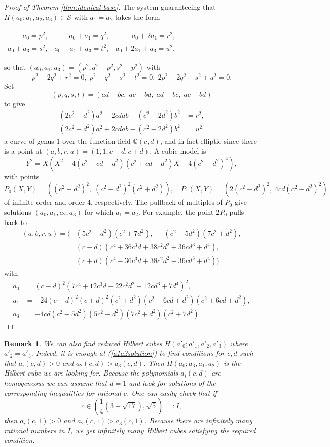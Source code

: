 \documentclass[10pt]{amsart}
\theoremstyle{plain}
\newtheorem{rem}[thm]{Remark}
\def\cal{\mathcal}
\def\bbb{\mathbb}
\newcommand{\Q}{\bbb{Q}}
\begin{document}
\begin{proof}[Proof of Theorem \ref{thm:idenical base}]
The system guaranteeing that $H(a_{0}; a_{1}, a_{2}, a_{3})\in\cal{S}$ with $a_{1}=a_{2}$ takes the form
\begin{center}
\begin{tabular}{rrr}
        $a_0=p^2$, & $a_0+a_1=q^2$, & $a_0+2a_1=r^2$, \\
        $a_0+a_3=s^2$, & $a_0+a_1+a_3=t^2$, & $a_0+2a_1+a_3=u^2$,
\end{tabular}
\end{center}
so that $(a_0,a_1,a_3) = (p^2, q^2-p^2, s^2-p^2)$ with
\[ p^2-2q^2+r^2 = 0, \; p^2-q^2-s^2+t^2 = 0, \; 2p^2-2q^2-s^2+u^2 = 0. \]
Set
\[ (p,q,s,t) = (a d-b c, \; a c-b d, \; a d+b c, \; a c+b d) \]
to give
\begin{align*}
(2c^2-d^2) a^2 - 2c d a b - (c^2-2d^2) b^2 & = r^2, \\
(2c^2-d^2) a^2 + 2c d a b - (c^2-2d^2) b^2 & = u^2
\end{align*}
a curve of genus 1 over the function field $\Q(c,d)$,
and in fact elliptic since there is a point at $(a,b,r,u)=(1,1,c-d,c+d)$.
A cubic model is
\[ Y^2 = X ( X^2 - 4(c^2-c d-d^2)(c^2+c d-d^2) X + 4(c^2-d^2)^4), \]
with points
\[ P_0(X,Y)=((c^2-d^2)^2, \; (c^2-d^2)^2(c^2+d^2)), \quad P_1(X,Y)=(2(c^2-d^2)^2, \; 4c d(c^2-d^2)^2) \]
of infinite order and order 4, respectively.
The pullback of multiples of $P_0$ give solutions $(a_0,a_1,a_2,a_3)$ for which $a_1=a_2$. For example, the point $2P_0$ pulls back to
\begin{align*}
        (a,b,r,u) = ( & (5c^2-d^2)(c^2+7d^2), \; -(c^2-5d^2)(7c^2+d^2), \\
        & (c-d)(c^4+36c^3d+38c^2d^2+36c d^3+d^4), \\
        & (c+d)(c^4-36c^3d+38c^2d^2-36c d^3+d^4))
\end{align*}
with
\begin{equation}\label{a1a2solution}
\begin{aligned}
        a_0 & = (c-d)^2(7c^4+12c^3d-22c^2d^2+12c d^3+7d^4)^2, \\
        a_1 & = -24(c-d)^2(c+d)^2(c^2+d^2)(c^2-6c d+d^2)(c^2+6c d+d^2), \\
        a_3 & = -4c d(c^2-5d^2)(5c^2-d^2)(7c^2+d^2)(c^2+7d^2)
\end{aligned}
\end{equation}

\end{proof}
\begin{rem}
{\rm We can also find reduced Hilbert cubes $H(a'_{0};a'_{1},a'_{2},a'_{3})$ where $a'_2=a'_3$. 
Indeed, it is enough at (\ref{a1a2solution}) to find conditions for $c,d$ such that $a_{i}(c,d)>0$ and $a_{2}(c,d)>a_{3}(c,d)$. Then $H(a_{0};a_{3},a_{1},a_{2})$ is the Hilbert cube we are looking for. Because the polynomials $a_{i}(c,d)$ are homogeneous we can assume that $d=1$ and look for solutions of the corresponding inequalities for rational $c$.
One can easily check that if 
$$
c \in\left(\frac{1}{4} \left(3+\sqrt{17}\right), \sqrt{5} \right)=:I,
$$
then $a_{i}(c,1)>0$ and $a_{2}(c,1)>a_{3}(c,1)$. Because there are infinitely many rational numbers in $I$, we get infinitely many Hilbert cubes satisfying the required condition. 
}    
\end{rem}
\end{document}
